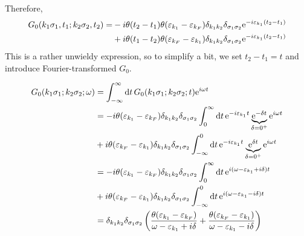 Therefore, 
\begin{align}
\label{eq:greens_time_domain}
\begin{split}
G_0(k_1\sigma_1, t_1;k_2\sigma_2, t_2) = &-i\theta(t_2-t_1)\theta(\varepsilon_{k_1} - \varepsilon_{k_F})\delta_{k_1k_2}\delta_{\sigma_1\sigma_2}\mathrm{e}^{-i\varepsilon_{k_1}(t_2-t_1)}\\
&+ i \theta(t_1-t_2)\theta(\varepsilon_{k_F} - \varepsilon_{k_1})\delta_{k_1k_2}\delta_{\sigma_1\sigma_2}\mathrm{e}^{-i\varepsilon_{k_1}(t_2-t_1)}
\end{split}
\end{align}
This is a rather unwieldy expression, so to simplify a bit, we set $t_2-t_1 = t$ and introduce Fourier-transformed $G_0$.

\begin{align*} 
G_0(k_1\sigma_1;k_2\sigma_2;\omega) &= \int_{-\infty}^\infty\dd{t}G_0(k_1\sigma_1;k_2\sigma_2 ; t)\mathrm{e}^{i\omega t} \\
&= -i\theta(\varepsilon_{k_1} - \varepsilon_{k_F})\delta_{k_1k_2}\delta_{\sigma_1\sigma_2}\int_{0}^\infty\dd{t}\mathrm{e}^{-i\varepsilon_{k_1}t}\underbrace{\mathrm{e}^{-\delta t}}_{\delta = 0^+}\mathrm{e}^{i\omega t} \\
&+ i\theta(\varepsilon_{k_F} - \varepsilon_{k_1})\delta_{k_1k_2}\delta_{\sigma_1\sigma_2}\int_{-\infty}^0\dd{t}\mathrm{e}^{-i\varepsilon_{k_1}t}\underbrace{\mathrm{e}^{\delta t}}_{\delta = 0^+}\mathrm{e}^{i\omega t} \\
&= -i\theta(\varepsilon_{k_1} - \varepsilon_{k_F})\delta_{k_1k_2}\delta_{\sigma_1\sigma_2}\int_{0}^\infty \dd{t}\mathrm{e}^{i(\omega -\varepsilon_{k_1} + i\delta)t} \\
& + i\theta(\varepsilon_{k_F} - \varepsilon_{k_1})\delta_{k_1k_2}\delta_{\sigma_1\sigma_2}\int_{-\infty}^0\dd{t}\mathrm{e}^{i(\omega-\varepsilon_{k_1}-i\delta)t} \\
&= \delta_{k_1k_2}\delta_{\sigma_1\sigma_2}\left( \frac{\theta(\varepsilon_{k_1} - \varepsilon_{k_F})}{\omega-\varepsilon_{k_1} + i\delta} + \frac{\theta(\varepsilon_{k_F}-\varepsilon_{k_1})}{\omega - \varepsilon_{k_1} - i\delta} \right)
\end{align*}
